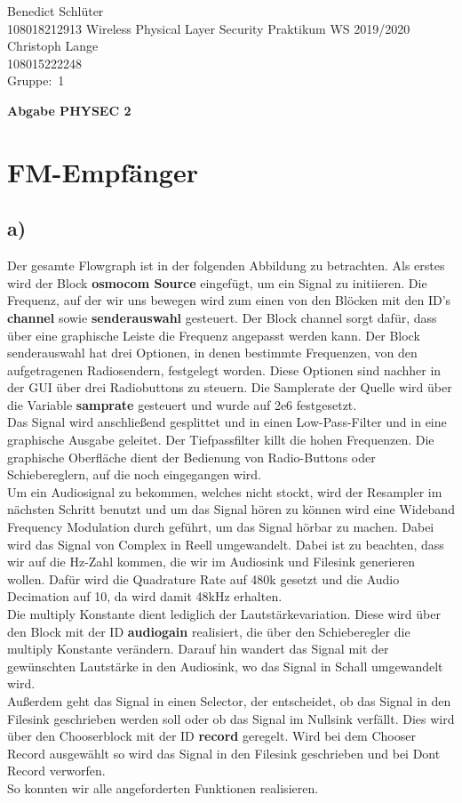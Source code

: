 \documentclass[12pt,a4paper]{article}
\newcommand{\student}{Benedict Schlüter\\ 108018212913 } %
\newcommand{\partner}{Christoph Lange\\ 108015222248} %
\newcommand{\group}{1} %
\newcommand{\hwheadtwo}{$ $
  \vspace{-2cm}
  
\noindent \student \qquad \qquad  Wireless Physical Layer Security Praktikum \hfill WS 2019/2020 \\
\noindent \partner \\
\noindent Gruppe:~\group\\
$ $

  
\begin{center}    
{\Large \bf Abgabe PHYSEC 2}
\end{center}
}
\begin{document}
\hwheadtwo

\section{FM-Empfänger}
\subsection*{a)}
Der gesamte Flowgraph ist in der folgenden Abbildung zu betrachten. 
Als erstes wird der Block \textbf{osmocom Source} eingefügt, um ein Signal zu initiieren. Die Frequenz, auf der wir uns bewegen wird zum einen von den Blöcken mit den ID's \textbf{channel} sowie \textbf{senderauswahl} gesteuert. Der Block channel sorgt dafür, dass über eine graphische Leiste die Frequenz angepasst werden kann. Der Block senderauswahl hat drei Optionen, in denen bestimmte Frequenzen, von den aufgetragenen Radiosendern, festgelegt worden. Diese Optionen sind nachher in der GUI über drei Radiobuttons zu steuern. Die Samplerate der Quelle wird über die Variable \textbf{samprate} gesteuert und wurde auf 2e6 festgesetzt.\\
Das Signal wird anschließend gesplittet und in einen Low-Pass-Filter und in eine graphische Ausgabe geleitet. Der Tiefpassfilter killt die hohen Frequenzen. Die graphische Oberfläche dient der Bedienung von Radio-Buttons oder Schiebereglern, auf die noch eingegangen wird.\\
Um ein Audiosignal zu bekommen, welches nicht stockt, wird der Resampler im nächsten Schritt benutzt und um das Signal hören zu können wird eine Wideband Frequency Modulation durch geführt, um das Signal hörbar zu machen. Dabei wird das Signal von Complex in Reell umgewandelt. Dabei ist zu beachten, dass wir auf die Hz-Zahl kommen, die wir im Audiosink und Filesink generieren wollen. Dafür wird die Quadrature Rate auf 480k gesetzt und die Audio Decimation auf 10, da wird damit 48kHz erhalten.\\
Die multiply Konstante dient lediglich der Lautstärkevariation. Diese wird über den Block mit der ID \textbf{audiogain} realisiert, die über den Schieberegler die multiply Konstante verändern. Darauf hin wandert das Signal mit der gewünschten Lautstärke in den Audiosink, wo das Signal in Schall umgewandelt wird. \\
Außerdem geht das Signal in einen Selector, der entscheidet, ob das Signal in den Filesink geschrieben werden soll oder ob das Signal im Nullsink verfällt. Dies wird über den Chooserblock mit der ID \textbf{record} geregelt. Wird bei dem Chooser Record ausgewählt so wird das Signal in den Filesink geschrieben und bei Dont Record verworfen. \\
So konnten wir alle angeforderten Funktionen realisieren.
\end{document}
